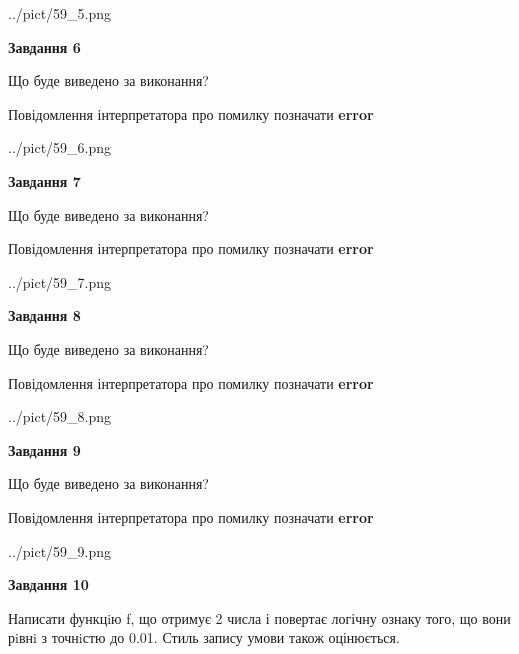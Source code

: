 \documentclass[12pt, ukrainian]{article}
\begin{document}
{\begin {large}
\begin{center}
	{../pict/59_5.png}
\end{center}
\newpage

{\begin {center}\textbf{Завдання 6}\end {center}}\par
Що буде виведено за виконання? \par
Повідомлення інтерпретатора про помилку позначати \textbf{error}

\begin{center}
	{../pict/59_6.png}
\end{center}
\newpage

{\begin {center}\textbf{Завдання 7}\end {center}}\par
Що буде виведено за виконання? \par
Повідомлення інтерпретатора про помилку позначати \textbf{error}

\begin{center}
	{../pict/59_7.png}
\end{center}
\newpage

{\begin {center}\textbf{Завдання 8}\end {center}}\par
Що буде виведено за виконання? \par
Повідомлення інтерпретатора про помилку позначати \textbf{error}

\begin{center}
	{../pict/59_8.png}
\end{center}
\newpage

{\begin {center}\textbf{Завдання 9}\end {center}}\par
Що буде виведено за виконання? \par
Повідомлення інтерпретатора про помилку позначати \textbf{error}

\begin{center}
	{../pict/59_9.png}
\end{center}
\newpage

{\begin {center}\textbf{Завдання 10}\end {center}}\par

Написати функцiю f, що отримує 2 числа і повертає логічну ознаку того, що вони рiвнi з точнiстю до 0.01. Стиль запису умови також оцінюється.\par
\newpage

\end {large}}
\end{document}
